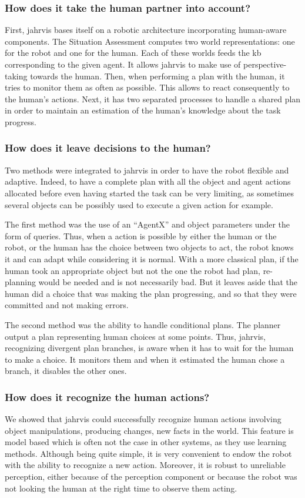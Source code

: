 \documentclass[a4paper,11pt,twoside]{StyleThese}
\begin{document}
\subsubsection*{How does it take the human partner into account?} First, \acrshort{jahrvis} bases itself on a robotic architecture incorporating human-aware components. The Situation Assessment computes two world representations: one for the robot and one for the human. Each of these worlds feeds the \acrlong{kb} corresponding to the given agent. It allows \acrshort{jahrvis} to make use of perspective-taking towards the human. Then, when performing a plan with the human, it tries to monitor them as often as possible. This allows to react consequently to the human's actions. Next, it has two separated processes to handle a shared plan in order to maintain an estimation of the human's knowledge about the task progress.

\subsubsection*{How does it leave decisions to the human?} Two methods were integrated to \acrshort{jahrvis} in order to have the robot flexible and adaptive. Indeed, to have a complete plan with all the object and agent actions allocated before even having started the task can be very limiting, as sometimes several objects can be possibly used to execute a given action for example. 

The first method was the use of an ``AgentX'' and object parameters under the form of \sparql{} queries. Thus, when a action is possible by either the human or the robot, or the human has the choice between two objects to act, the robot knows it and can adapt while considering it is normal. With a more classical plan, if the human took an appropriate object but not the one the robot had plan, re-planning would be needed and is not necessarily bad. But it leaves aside that the human did a choice that was making the plan progressing, and so that they were committed and not making errors.

The second method was the ability to handle conditional plans. The planner output a plan representing human choices at some points. Thus, \acrshort{jahrvis}, recognizing divergent plan branches, is aware when it has to wait for the human to make a choice. It monitors them and when it estimated the human chose a branch, it disables the other ones.

\subsubsection*{How does it recognize the human actions?} We showed that \acrshort{jahrvis} could successfully recognize human actions involving object manipulations, producing changes, new facts in the world. This feature is model based which is often not the case in other systems, as they use learning methods. Although being quite simple, it is very convenient to endow the robot with the ability to recognize a new action. Moreover, it is robust to unreliable perception, either because of the perception component or because the robot was not looking the human at the right time to observe them acting.
\end{document}

